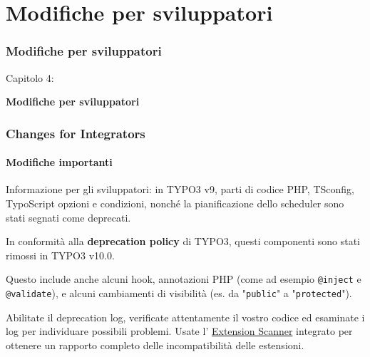 %

\section{Modifiche per sviluppatori}
\begin{frame}[fragile]
	\frametitle{Modifiche per sviluppatori}

	\begin{center}\huge{Capitolo 4:}\end{center}
	\begin{center}\huge{\color{typo3darkgrey}\textbf{Modifiche per sviluppatori}}\end{center}

\end{frame}


\begin{frame}[fragile]
	\frametitle{Changes for Integrators}
	\framesubtitle{Modifiche importanti}

	\small
		Informazione per gli sviluppatori: in TYPO3 v9, parti di codice PHP, TSconfig, TypoScript
            opzioni e condizioni, nonché la pianificazione dello scheduler sono stati segnati come deprecati.

		\vspace{0.2cm}

		In conformità alla \textbf{deprecation policy} di TYPO3, questi componenti sono stati
		rimossi in TYPO3 v10.0.

		\vspace{0.2cm}

		Questo include anche alcuni hook, annotazioni PHP (come ad esempio \texttt{@inject} e
		\texttt{@validate}), e alcuni cambiamenti di visibilità (es. da
		"\texttt{public}" a "\texttt{protected}").

		\vspace{0.2cm}

		Abilitate il deprecation log, verificate attentamente il vostro codice ed esaminate i log per
		individuare possibili problemi. Usate l'
		\href{https://docs.typo3.org/m/typo3/reference-coreapi/master/en-us/ApiOverview/ExtensionScanner/Index.html}{Extension Scanner}
		integrato per ottenere un rapporto completo delle incompatibilità delle estensioni.

	\normalsize

\end{frame}

